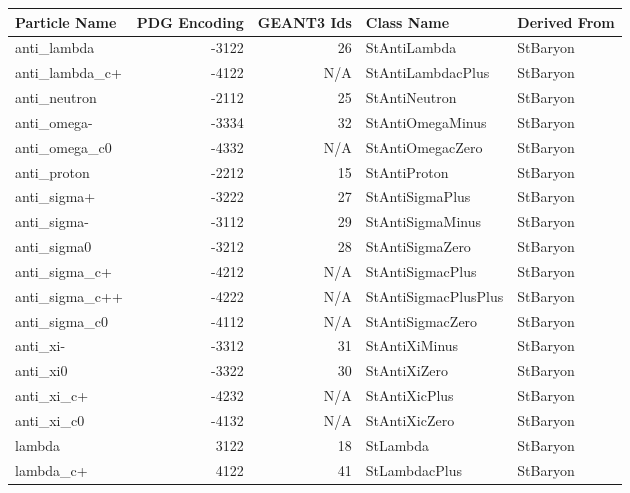 \documentclass[twoside]{article}
\begin{document}
\begin{table}[htb]
    \begin{center}
    \begin{tabular}{|l|r|r|l| l |}
        \hline
        \textbf{Particle Name} & \textbf{PDG Encoding} & \textbf{GEANT3 Ids}  & \textbf{Class Name} & \textbf{Derived From} \\ \hline
  anti\_lambda  & -3122 & 26    &         StAntiLambda  & StBaryon       \\ \hline
anti\_lambda\_c+  & -4122 & N/A   &    StAntiLambdacPlus  & StBaryon       \\ \hline
  anti\_neutron  & -2112 & 25    &        StAntiNeutron  & StBaryon       \\ \hline
   anti\_omega-  & -3334 & 32    &     StAntiOmegaMinus  & StBaryon       \\ \hline
 anti\_omega\_c0  & -4332 & N/A   &     StAntiOmegacZero  & StBaryon       \\ \hline
   anti\_proton  & -2212 & 15    &         StAntiProton  & StBaryon       \\ \hline
   anti\_sigma+  & -3222 & 27    &      StAntiSigmaPlus  & StBaryon       \\ \hline
   anti\_sigma-  & -3112 & 29    &     StAntiSigmaMinus  & StBaryon       \\ \hline
   anti\_sigma0  & -3212 & 28    &      StAntiSigmaZero  & StBaryon       \\ \hline
 anti\_sigma\_c+  & -4212 & N/A   &     StAntiSigmacPlus  & StBaryon       \\ \hline
anti\_sigma\_c++  & -4222 & N/A   & StAntiSigmacPlusPlus  & StBaryon       \\ \hline
 anti\_sigma\_c0  & -4112 & N/A   &     StAntiSigmacZero  & StBaryon       \\ \hline
      anti\_xi-  & -3312 & 31    &        StAntiXiMinus  & StBaryon       \\ \hline
      anti\_xi0  & -3322 & 30    &         StAntiXiZero  & StBaryon       \\ \hline
    anti\_xi\_c+  & -4232 & N/A   &        StAntiXicPlus  & StBaryon       \\ \hline
    anti\_xi\_c0  & -4132 & N/A   &        StAntiXicZero  & StBaryon       \\ \hline
        lambda  & 3122  & 18    &             StLambda  & StBaryon       \\ \hline
     lambda\_c+  & 4122  & 41    &        StLambdacPlus  & StBaryon       \\ \hline

\end{tabular}
\end{center}
\end{table}
\end{document}
